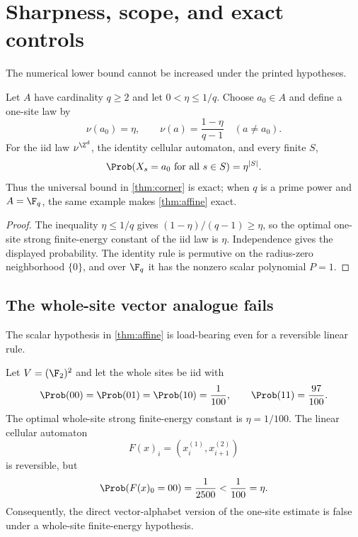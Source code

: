 \section{Sharpness, scope, and exact controls}
\label{sec:scope}

The numerical lower bound cannot be increased under the printed hypotheses.

\begin{proposition}\label{prop:sharpness}
Let $A$ have cardinality $q\geq2$ and let $0<\eta\leq1/q$.  Choose
$a_0\in A$ and define a one-site law by
\[
  \nu(a_0)=\eta,\qquad
  \nu(a)=\frac{1-\eta}{q-1}\quad(a\neq a_0).
\]
For the iid law $\nu^{\Z^d}$, the identity cellular automaton, and every
finite $S$,
\[
  \Prob(X_s=a_0\text{ for all }s\in S)=\eta^{|S|}.
\]
Thus the universal bound in \cref{thm:corner} is exact; when $q$ is a prime
power and $A=\F_q$, the same example makes \cref{thm:affine} exact.
\end{proposition}

\begin{proof}
The inequality $\eta\leq1/q$ gives
$(1-\eta)/(q-1)\geq\eta$, so the optimal one-site strong finite-energy
constant of the iid law is $\eta$.  Independence gives the displayed
probability.  The identity rule is permutive on the radius-zero neighborhood
$\{0\}$, and over $\F_q$ it has the nonzero scalar polynomial $P=1$.
\end{proof}

\subsection{The whole-site vector analogue fails}

The scalar hypothesis in \cref{thm:affine} is load-bearing even for a
reversible linear rule.

\begin{proposition}\label{prop:vector-firewall}
Let $V=(\F_2)^2$ and let the whole sites be iid with
\[
 \Prob(00)=\Prob(01)=\Prob(10)=\frac1{100},
 \qquad
 \Prob(11)=\frac{97}{100}.
\]
The optimal whole-site strong finite-energy constant is $\eta=1/100$.  The
linear cellular automaton
\[
  F(x)_i=(x_i^{(1)},x_{i+1}^{(2)})
\]
is reversible, but
\[
  \Prob(F(x)_0=00)=\frac1{2500}<\frac1{100}=\eta.
\]
Consequently, the direct vector-alphabet version of the one-site estimate is
false under a whole-site finite-energy hypothesis.
\end{proposition}

